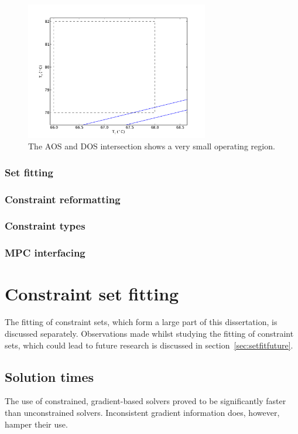 \begin{figure}[htbp]
  \centering
    \includegraphics[width=8cm]{graph/columnaosfocus.pdf}
  \caption[AOS and DOS intersection of the laboratory distillation column]{The AOS and DOS intersection shows a very small operating region.}
  \label{fig:columnaosfocus}
\end{figure}

\subsubsection{Set fitting}
\subsubsection{Constraint reformatting}
\subsubsection{Constraint types}
\subsubsection{MPC interfacing}

\section{Constraint set fitting}
The fitting of constraint sets, which form a large part of this dissertation, is discussed separately.
Observations made whilst studying the fitting of constraint sets, which could lead to future research is discussed in section~\ref{sec:setfitfuture}.

\subsection{Solution times}
The use of constrained, gradient-based solvers proved to be significantly faster than unconstrained solvers.
Inconsistent gradient information does, however, hamper their use.

